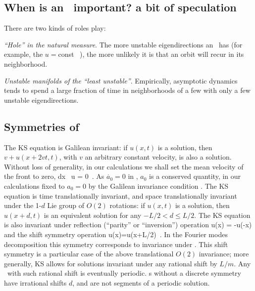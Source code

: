 \subsection{When is an \eqv\ important? a bit of speculation} 

There are two kinds of roles
{\eqva} play:

{\em ``Hole'' in the natural measure}.
The more unstable eigendirections an \eqv\ has (for example, the
$u=$const \eqv~), the more unlikely it is  that
an orbit will recur in its neighborhood.

{\em Unstable manifolds of the ``least unstable''{\eqva}}.
Empirically, asymptotic dynamics tends to spend
a large fraction of time in
neighborhoods of a few  {\eqva} with
only a few unstable eigendirections.


\subsection{Symmetries of \KSe}

The  KS equation is
Galilean invariant: if $u(x,t)$ is a solution, then 
$v+u(x+2vt,t)$, with $v$ an arbitrary constant velocity, is also a solution. 
Without loss of generality, in our calculations we shall set 
the mean velocity of the  front to zero,
\beq
\int dx \, u = 0
\,.
As  $\dot{a_0}=0$ in , 
$a_0$ is a conserved quantity, in our calculations
fixed to $a_0=0$ by the Galilean invariance condition .
The KS equation   is time translationally invariant,
and 
space translationally invariant
under the 1-$d$ Lie group of $O(2)$ rotations: if
$u(x,t)$ is a solution, then $u(x+d,t)$ is an equivalent
solution for any $-L/2 < d \leq L/2$.
The KS equation is also invariant under
reflection (``parity'' or ``inversion'') operation
\beq
\Refl u(x) = -u(-x)
and the shift symmetry operation 
\beq
\Shift u(x)=u(x+L/2)
\,. 
In the Fourier modes decomposition  this
symmetry corresponds to invariance under
.
This shift symmetry is a particular case of the
above translational $O(2)$ invariance; more generally,
KS allows for solutions invariant under any rational shift by
$L/m$. Any \rpo\ with such rational shift is eventually periodic.
\Rpo s without a discrete symmetry have irrational shifts
$d$, and are not segments of a periodic solution.


